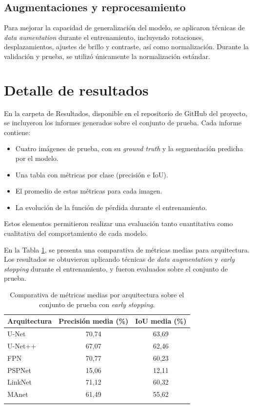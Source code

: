 \subsection{Augmentaciones y reprocesamiento}
Para mejorar la capacidad de generalización del modelo, se aplicaron técnicas de \textit{data aumentation} durante el entrenamiento, incluyendo rotaciones, desplazamientos, ajustes de brillo y contraste, así como normalización. Durante la validación y prueba, se utilizó únicamente la normalización estándar.

\section{Detalle de resultados}
En la carpeta de Resultados, disponible en el repositorio de GitHub del proyecto, se incluyeron los informes generados sobre el conjunto de prueba. Cada informe contiene:
\begin{itemize}
    \item Cuatro imágenes de prueba, con su \textit{ground truth} y la segmentación predicha por el modelo.
    \item Una tabla con métricas por clase (precisión e IoU).
    \item El promedio de estas métricas para cada imagen.
    \item La evolución de la función de pérdida durante el entrenamiento.
\end{itemize}

Estos elementos permitieron realizar una evaluación tanto cuantitativa como cualitativa del comportamiento de cada modelo.

En la Tabla \ref{tab:resultados_earlystopping}, se presenta una comparativa de métricas medias para arquitectura. Los resultados se obtuvieron aplicando técnicas de \textit{data augmentation} y \textit{early stopping} durante el entrenamiento, y fueron evaluados sobre el conjunto de prueba. 

\begin{table}[h]
    \centering
    \begin{tabular}{lcc}
    \textbf{Arquitectura} & \textbf{Precisión media (\%)} & \textbf{IoU media (\%)} \\
    \hline
    U-Net             & 70,74 & 63,69\\
    U-Net++           & 67,07 & 62,46\\
    FPN               & 70,77 & 60,23\\
    PSPNet            & 15,06 & 12,11\\
    LinkNet           & 71,12 & 60,32\\
    MAnet             & 61,49 & 55,62\\
    \hfill
    \end{tabular}
    \caption{Comparativa de métricas medias por arquitectura sobre el conjunto de prueba con \textit{early stopping}.} \label{tab:resultados_earlystopping}
\end{table}

